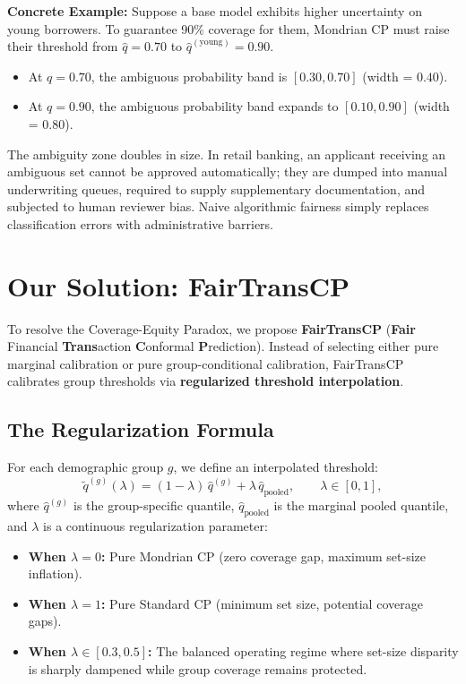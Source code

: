 \documentclass[11pt,a4paper]{article}
\begin{document}
\noindent\textbf{Concrete Example:} 
Suppose a base model exhibits higher uncertainty on young borrowers. To guarantee 90\% coverage for them, Mondrian CP must raise their threshold from $\hat{q} = 0.70$ to $\hat{q}^{(\text{young})} = 0.90$. 
\begin{itemize}[leftmargin=1.5em, itemsep=2pt]
    \item At $q = 0.70$, the ambiguous probability band is $[0.30, 0.70]$ (width = $0.40$).
    \item At $q = 0.90$, the ambiguous probability band expands to $[0.10, 0.90]$ (width = $0.80$).
\end{itemize}
The ambiguity zone doubles in size. In retail banking, an applicant receiving an ambiguous set cannot be approved automatically; they are dumped into manual underwriting queues, required to supply supplementary documentation, and subjected to human reviewer bias. Naive algorithmic fairness simply replaces classification errors with administrative barriers.

\section{Our Solution: FairTransCP}

To resolve the Coverage-Equity Paradox, we propose \textbf{FairTransCP} (\textbf{Fair} Financial \textbf{Trans}action \textbf{C}onformal \textbf{P}rediction). Instead of selecting either pure marginal calibration or pure group-conditional calibration, FairTransCP calibrates group thresholds via \textbf{regularized threshold interpolation}.

\subsection{The Regularization Formula}
For each demographic group $g$, we define an interpolated threshold:
\begin{equation}
\tilde{q}^{(g)}(\lambda) = (1 - \lambda)\,\hat{q}^{(g)} + \lambda\,\hat{q}_{\text{pooled}}, \qquad \lambda \in [0, 1],
\end{equation}
where $\hat{q}^{(g)}$ is the group-specific quantile, $\hat{q}_{\text{pooled}}$ is the marginal pooled quantile, and $\lambda$ is a continuous regularization parameter:
\begin{itemize}[leftmargin=1.5em, itemsep=2pt]
    \item \textbf{When $\lambda = 0$:} Pure Mondrian CP (zero coverage gap, maximum set-size inflation).
    \item \textbf{When $\lambda = 1$:} Pure Standard CP (minimum set size, potential coverage gaps).
    \item \textbf{When $\lambda \in [0.3, 0.5]$:} The balanced operating regime where set-size disparity is sharply dampened while group coverage remains protected.
\end{itemize}
\end{document}
